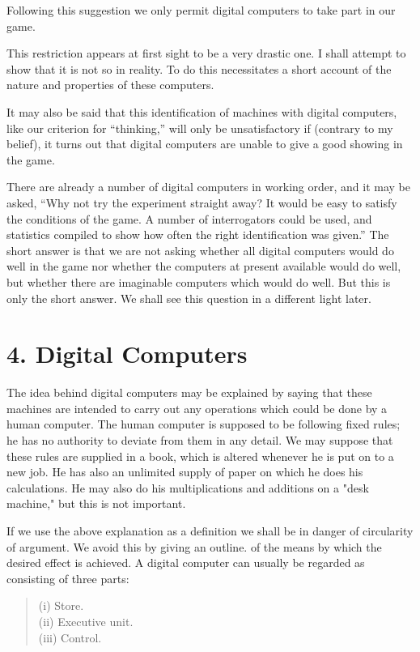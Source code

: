 \documentclass[10pt,twoside,openright]{memoir}
\begin{document}
Following this suggestion we only permit digital computers to take part in our game.

This restriction appears at first sight to be a very drastic one. I shall attempt to show that it is not so in reality. To do this necessitates a short account of the nature and properties of these computers.

It may also be said that this identification of machines with digital computers, like our criterion for ``thinking,'' will only be unsatisfactory if (contrary to my belief), it turns out that digital computers are unable to give a good showing in the game.

There are already a number of digital computers in working order, and it may be asked, ``Why not try the experiment straight away? It would be easy to satisfy the conditions of the game. A number of interrogators could be used, and statistics compiled to show how often the right identification was given.'' The short answer is that we are not asking whether all digital computers would do well in the game nor whether the computers at present available would do well, but whether there are imaginable computers which would do well. But this is only the short answer. We shall see this question in a different light later.

\section{4. Digital Computers}

The idea behind digital computers may be explained by saying that these machines are intended to carry out any operations which could be done by a human computer. The human computer is supposed to be following fixed rules; he has no authority to deviate from them in any detail. We may suppose that these rules are supplied in a book, which is altered whenever he is put on to a new job. He has also an unlimited supply of paper on which he does his calculations. He may also do his multiplications and additions on a "desk machine," but this is not important.

If we use the above explanation as a definition we shall be in danger of circularity of argument. We avoid this by giving an outline. of the means by which the desired effect is achieved. A digital computer can usually be regarded as consisting of three parts:

\begin{quotation}
\noindent (i) Store.\\
(ii) Executive unit.\\
(iii) Control.\\
\end{quotation}
\end{document}
